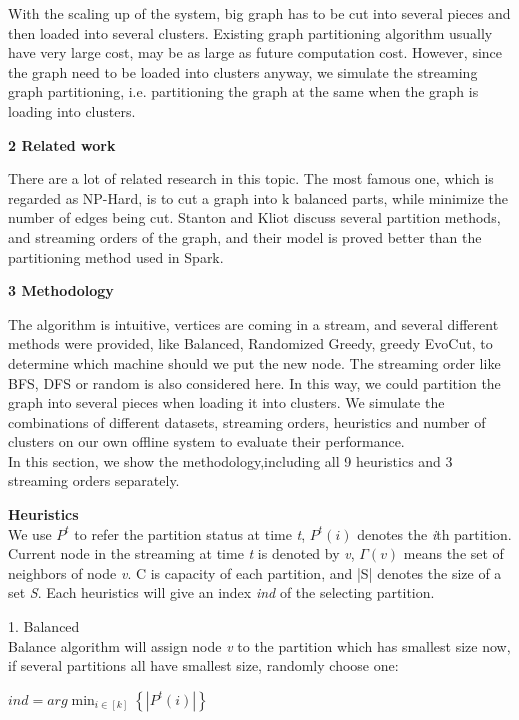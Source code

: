 \documentclass[12pt]{article}
\begin{document}
With the scaling up of the system, big graph has to be cut into several pieces and then loaded into several clusters. Existing graph partitioning algorithm usually have very large cost, may be as large as future computation cost. However, since the graph need to be loaded into clusters anyway, we simulate the streaming graph partitioning, i.e. partitioning the graph at the same when the graph is loading into clusters.

\textbf{2 Related work}

There are a lot of related research in this topic. The most famous one, which is regarded as NP-Hard, is to cut a graph into k balanced parts, while minimize the number of edges being cut. Stanton and Kliot discuss several partition methods, and streaming orders of the graph, and their model is proved better than the partitioning method used in Spark.

\textbf{3 Methodology}

The algorithm is intuitive, vertices are coming in a stream, and several different methods were provided, like Balanced, Randomized Greedy, greedy EvoCut, to determine which machine should we put the new node. The streaming order like BFS, DFS or random is also considered here. In this way, we could partition the graph into several pieces when loading it into clusters. We simulate the combinations of different datasets, streaming orders, heuristics and number of clusters on our own offline system to evaluate their performance.\\
In this section, we show the methodology,including all 9 heuristics and 3 streaming orders separately.

\textbf{Heuristics}\\
We use $P^{t}$ to refer the partition status at time \emph{t}, $P^{t}(i)$ denotes the \emph{i}th partition. Current node in the streaming at time \emph{t} is denoted by \emph{v}, $\Gamma (v)$ means the set of neighbors of node \emph{v}. C is capacity of each partition, and |S| denotes the size of a set \emph{S}. Each heuristics will give an index \emph{ind} of the selecting partition.

1. Balanced\\
Balance algorithm will assign node \emph{v} to the partition which has smallest size now, if several partitions all have smallest size, randomly choose one:
\begin {center}
$ind = arg \min_{i\in \left [ k \right ]}\left \{ \left | P^{t}(i) \right | \right \}$
\end{center}
\end{document}
